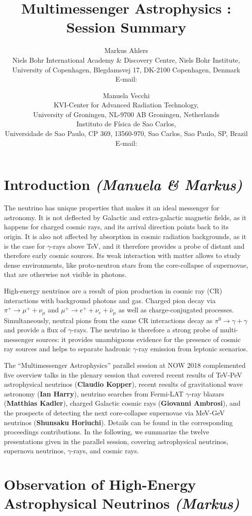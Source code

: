 \documentclass{PoS}
\title{Multimessenger Astrophysics : Session Summary}
\author{Markus Ahlers\\
        Niels Bohr International Academy \& Discovery Centre, Niels Bohr Institute,\\University of Copenhagen, Blegdamsvej 17, DK-2100 Copenhagen, Denmark\\
        E-mail: \email{markus.ahlers@nbi.ku.dk}}
\author{Manuela Vecchi\\
       KVI-Center for Advanced Radiation Technology,\\University of Groningen, NL-9700 AB Groningen, Netherlands\\Instituto de F\'isica de Sao Carlos,\\ Universidade de Sao Paulo, CP 369, 13560-970, Sao Carlos, Sao Paulo, SP, Brazil\\
        E-mail: \email{m.vecchi@rug.nl}}
\begin{document}
\section{Introduction {\it (Manuela \& Markus)}}


The neutrino has unique properties that makes it an ideal messenger for astronomy. It is not deflected by Galactic and extra-galactic magnetic fields, as it happens for charged cosmic rays, and its arrival direction points back to its origin. It is also not affected by absorption in cosmic radiation backgrounds, as it is the case for $\gamma$-rays above TeV, and it therefore provides a probe of distant and therefore early cosmic sources. Its weak interaction with matter allows to study dense environments, like proto-neutron stars from the core-collapse of supernovae, that are otherwise not visible in photons.

High-energy neutrinos are a result of pion production in cosmic ray (CR) interactions with background photons and gas. Charged pion decay via $\pi^+\to\mu^++\nu_\mu$ and $\mu^+\to e^++\nu_e+\bar\nu_\mu$ as well as charge-conjugated processes. Simultaneously, neutral pions from the same CR interactions decay as $\pi^0\to\gamma+\gamma$ and provide a flux of $\gamma$-rays. The neutrino is therefore a strong probe of multi-messenger sources: it provides unambiguous evidence for the presence of cosmic ray sources and helps to separate hadronic $\gamma$-ray emission from leptonic scenarios.

The ``Multimessenger Astrophysics'' parallel session at NOW 2018 complemented five overview talks in the plenary session that covered recent results of TeV-PeV astrophysical neutrinos ({\bf Claudio Kopper}), recent results of gravitational wave astronomy ({\bf Ian Harry}), neutrino searches from Fermi-LAT $\gamma$-ray blazars ({\bf Matthias Kadler}), charged Galactic cosmic rays  ({\bf  Giovanni Ambrosi}), and the prospects of detecting the next core-collapse supernovae via MeV-GeV neutrinos ({\bf Shunsaku Horiuchi}). Details can be found in the corresponding proceedings contributions. In the following, we summarize the twelve presentations given in the parallel session, covering astrophysical neutrinos, supernova neutrinos, $\gamma$-rays, and cosmic rays.

\section{Observation of High-Energy Astrophysical Neutrinos {\it (Markus)}}
\end{document}
